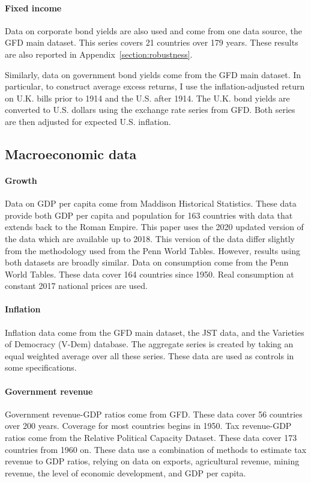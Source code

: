 \documentclass[12pt]{article}
\numberwithin{equation}{section}
\begin{document}
\paragraph{Fixed income}

Data on corporate bond yields are also used and come from one data source, the GFD main dataset. This series covers 21 countries over 179 years.  These results are also reported in Appendix~\ref{section:robustness}. 

Similarly, data on government bond yields come from the GFD main dataset. In particular, to construct average excess returns, I use the inflation-adjusted return on U.K. bills prior to 1914 and the U.S. after 1914. The U.K. bond yields are converted to U.S. dollars using the exchange rate series from GFD. Both series are then adjusted for expected U.S. inflation.
\label{par:convert_dollars_bnd}

\subsection{Macroeconomic data}\label{section:macro_data}

\paragraph{Growth}
Data on GDP per capita come from Maddison Historical Statistics.  These data provide both GDP per capita and population for 163 countries with data that extends back to the Roman Empire.  This paper uses the 2020 updated version of the data which are available up to 2018. This version of the data differ slightly from the methodology used from the Penn World Tables. However, results using both datasets are broadly similar. Data on consumption come from the Penn World Tables. These data cover 164 countries since 1950. Real consumption at constant 2017 national prices are used.

\paragraph{Inflation}
Inflation data come from the GFD main dataset, the JST data, and the Varieties of Democracy (V-Dem) database. The aggregate series is created by taking an equal weighted average over all these series. These data are used as controls in some specifications.

\paragraph{Government revenue}
Government revenue-GDP ratios come from GFD.  These data cover 56 countries over 200 years. Coverage for most countries begins in 1950. Tax revenue-GDP ratios come from the Relative Political Capacity Dataset. These data cover 173 countries from 1960 on. These data use a combination of methods to estimate tax revenue to GDP ratios, relying on data on exports, agricultural revenue, mining revenue, the level of economic development, and GDP per capita. 
\end{document}
